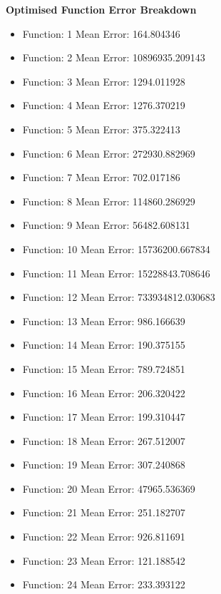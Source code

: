 \documentclass[12pt]{article}
\begin{document}
\textbf{Optimised Function Error Breakdown}
\begin{itemize}
	\item Function:  1  Mean Error: 164.804346
	\item Function:  2  Mean Error: 10896935.209143
	\item Function:  3  Mean Error: 1294.011928
	\item Function:  4  Mean Error: 1276.370219
	\item Function:  5  Mean Error: 375.322413	
	\item Function:  6  Mean Error: 272930.882969
	\item Function:  7  Mean Error: 702.017186
	\item Function:  8  Mean Error: 114860.286929
	\item Function:  9  Mean Error: 56482.608131
	\item Function: 10  Mean Error: 15736200.667834
	\item Function: 11  Mean Error: 15228843.708646
	\item Function: 12  Mean Error: 733934812.030683
	\item Function: 13  Mean Error: 986.166639
	\item Function: 14  Mean Error: 190.375155
	\item Function: 15  Mean Error: 789.724851
	\item Function: 16  Mean Error: 206.320422
	\item Function: 17  Mean Error: 199.310447
	\item Function: 18  Mean Error: 267.512007
	\item Function: 19  Mean Error: 307.240868
	\item Function: 20  Mean Error: 47965.536369
	\item Function: 21  Mean Error: 251.182707
	\item Function: 22  Mean Error: 926.811691
	\item Function: 23  Mean Error: 121.188542	
	\item Function: 24  Mean Error: 233.393122
\end{itemize}

\newpage
\end{document}

